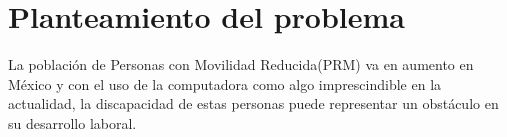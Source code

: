 \section{Planteamiento del problema}
La población de Personas con Movilidad Reducida(PRM) va en aumento en México 
 y con el uso de la computadora como algo imprescindible en la actualidad, la
 discapacidad de estas personas puede representar un obstáculo en su 
 desarrollo laboral.